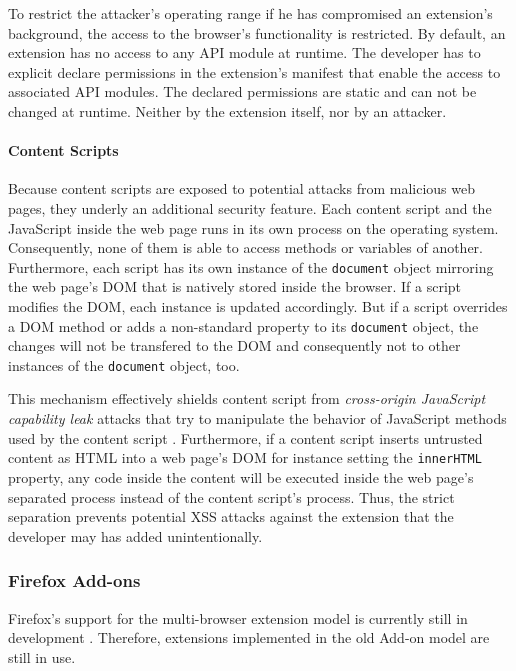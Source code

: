 	To restrict the attacker's operating range if he has compromised an extension's background, the access to the browser's functionality is restricted. By default, an extension has no access to any API module at runtime. The developer has to explicit declare permissions in the extension's manifest that enable the access to associated API modules. The declared permissions are static and can not be changed at runtime. Neither by the extension itself, nor by an attacker.
	
\paragraph{Content Scripts}

	Because content scripts are exposed to potential attacks from malicious web pages, they underly an additional security feature. Each content script and the JavaScript inside the web page runs in its own process on the operating system. Consequently, none of them is able to access methods or variables of another. Furthermore, each script has its own instance of the \texttt{document} object mirroring the web page's DOM that is natively stored inside the browser. If a script modifies the DOM, each instance is updated accordingly. But if a script overrides a DOM method or adds a non-standard property to its \texttt{document} object, the changes will not be transfered to the DOM and consequently not to other instances of the \texttt{document} object, too.	
	
	This mechanism effectively shields content script from \textit{cross-origin JavaScript capability leak} attacks that try to manipulate the behavior of JavaScript methods used by the content script \cite{Carlini:2012:EGC:2362793.2362800, Barth:2009:CJC:1855768.1855780}. Furthermore, if a content script inserts untrusted content as HTML into a web page's DOM for instance setting the \texttt{innerHTML} property, any code inside the content will be executed inside the web page's separated process instead of the content script's process. Thus, the strict separation prevents potential XSS attacks against the extension that the developer may has added unintentionally.

\subsubsection{Firefox Add-ons}

	Firefox's support for the multi-browser extension model is currently still in development \cite{mozillaWebExtensionStatus}. Therefore, extensions implemented in the old Add-on model are still in use. 
	
